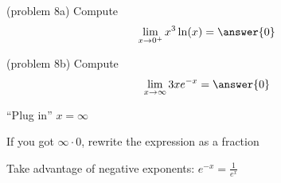\documentclass{ximera}
\begin{document}
\begin{problem}(problem 8a)
  Compute
  \[
  \lim_{x \to 0^+} x^3\ln(x) = \answer{0}
  \]
  
\end{problem}



\begin{problem}(problem 8b)
  Compute
  \[
  \lim_{x \to \infty} 3xe^{-x} = \answer{0}
  \]
  
    \begin{hint}
      ``Plug in'' $x=\infty$
    \end{hint}
    \begin{hint}
      If you got $\infty \cdot 0$, rewrite the expression as a fraction
    \end{hint}
    \begin{hint}
      Take advantage of negative exponents: $e^{-x} = \frac{1}{e^x}$
    \end{hint}
	
\end{problem}


\begin{center}
\begin{foldable}
\end{foldable}
\end{center}
\end{document}
